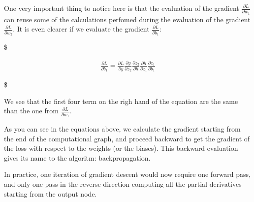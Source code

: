 \documentclass[11pt]{article}
\begin{document}
One very important thing to notice here is that the evaluation of the
gradient \(\frac{\partial L}{\partial w_1}\) can reuse some of the
calculations perfomed during the evaluation of the gradient
\(\frac{\partial L}{\partial w_2}\). It is even clearer if we evaluate
the gradient \(\frac{\partial L}{\partial b_1}\):

\$

\begin{equation} 
    \begin{split}
        \frac{\partial L}{\partial b_1} = \frac{\partial L}{\partial y} \frac{\partial y}{\partial z_2} \frac{\partial z_2}{\partial h} \frac{\partial h}{\partial z_1} \frac{\partial z_1}{\partial b_1}
    \end{split}
\end{equation}

\$

We see that the first four term on the righ hand of the equation are the
same than the one from \(\frac{\partial L}{\partial w_1}\).

As you can see in the equations above, we calculate the gradient
starting from the end of the computational graph, and proceed backward
to get the gradient of the loss with respect to the weights (or the
biases). This backward evaluation gives its name to the algoritm:
backpropagation.

In practice, one iteration of gradient descent would now require one
forward pass, and only one pass in the reverse direction computing all
the partial derivatives starting from the output node.


    
    
    
    
\end{document}
